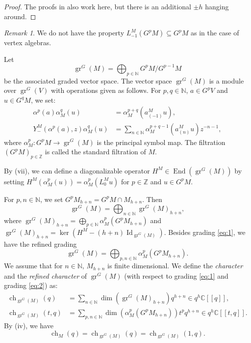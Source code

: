 \documentclass[a4paper, 12pt, reqno]{amsart}
\theoremstyle{remark}
\newtheorem{remark}[theorem]{Remark}
\DeclareMathOperator{\Id}{Id}
\DeclareMathOperator{\gr}{gr}
\DeclareMathOperator{\End}{End}
\DeclareMathOperator{\ch}{ch}
\begin{document}
\begin{proof}
  The proofs in \cite{li_vertex_2004} also work here, but there is an additional $\pm h$ hanging around.
\end{proof}

\begin{remark}
  \label{rmk:1}
  We do not have the property $L_{-1}^M(G^pM) \subseteq G^pM$ as in the case of vertex algebras.
\end{remark}

Let
\begin{equation*}
  \gr^G(M) = \bigoplus_{p \in \mathbb{N}}G^pM/G^{p - 1}M
\end{equation*}
be the associated graded vector space.
The vector space $\gr^G(M)$ is a module over $\gr^G(V)$ with operations given as follows.
For $p, q \in \mathbb{N}$, $a \in G^pV$ and $u \in G^qM$, we set:
\begin{align*}
  \alpha^p(a)\alpha_M^q(u) &= \alpha_M^{p + q}(a^M_{(-1)}u), \\
  Y^M_-(\alpha^p(a), z)\alpha_M^q(u) &= \sum_{n \in \mathbb{N}}\alpha_M^{p + q - 1}(a^M_{(n)}u)z^{-n - 1},
\end{align*}
where $\alpha_M^p: G^pM \to \gr^G(M)$ is the principal symbol map.
The filtration $(G^pM)_{p \in \mathbb{Z}}$ is called the standard filtration of $M$.

By (vii), we can define a diagonalizable operator $H^M \in \End(\gr^G(M))$ by setting $H^M(\alpha^p_M(u)) = \alpha^p_M(L^M_0u)$ for $p \in \mathbb{Z}$ and $u \in G^pM$.

For $p, n \in \mathbb{N}$, we set $G^pM_{h + n} = G^pM \cap M_{h + n}$.
Then
\begin{equation}
  \label{eq:1}
  \gr^G(M) = \bigoplus_{n \in \mathbb{N}}\gr^G(M)_{h + n},
\end{equation}
where $\gr^G(M)_{h + n} = \bigoplus_{p \in \mathbb{N}}\alpha^p_M(G^pM_{h + n})$ and $\gr^G(M)_{h + n} = \ker(H^M - (h + n)\Id_{\gr^G(M)})$.
Besides grading \eqref{eq:1}, we have the refined grading
\begin{equation}
  \label{eq:2}
  \gr^G(M) = \bigoplus_{p, n \in \mathbb{N}}\alpha^p_M(G^pM_{h + n}).
\end{equation}
We assume that for $n \in \mathbb{N}$, $M_{h + n}$ is finite dimensional.
We define the \emph{character} and the \emph{refined character} of $\gr^G(M)$ (with respect to grading \eqref{eq:1} and grading \eqref{eq:2}) as:
\begin{align*}
  \ch_{\gr^G(M)}(q) &= \sum_{n \in \mathbb{N}}\dim(\gr^G(M)_{h + n})q^{h + n} \in q^h\mathbb{C}[[q]], \\
  \ch_{\gr^G(M)}(t, q) &= \sum_{p, n \in \mathbb{N}}\dim(\alpha^p_M(G^pM_{h + n}))t^pq^{h + n} \in q^{h}\mathbb{C}[[t, q]].
\end{align*}
By (iv), we have
\begin{equation*}
  \ch_M(q) = \ch_{\gr^G(M)}(q) = \ch_{\gr^G(M)}(1, q).
\end{equation*}
\end{document}
